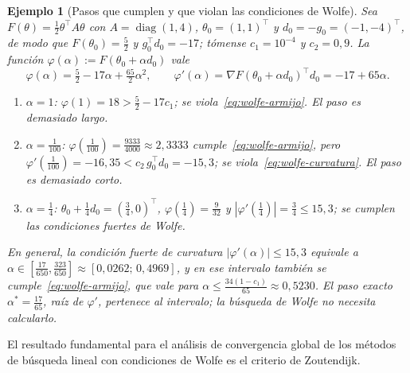 \documentclass[a4paper,openany,oneside,10pt]{report}
\theoremstyle{pnlTeorema}
\theoremstyle{pnlDefinicion}
\theoremstyle{pnlObservacion}
\newtheorem{ejemplo}{Ejemplo}[section]
\begin{document}
\begin{ejemplo}[Pasos que cumplen y que violan las condiciones de Wolfe]\label{ej:wolfe}
Sea $F(\theta)=\frac12\theta^\top A\theta$ con $A=\operatorname{diag}(1,4)$, $\theta_0=(1,1)^\top$ y $d_0=-g_0=(-1,-4)^\top$, de modo que $F(\theta_0)=\frac52$ y $g_0^\top d_0=-17$; tómense $c_1=10^{-4}$ y $c_2=0{,}9$. La función $\varphi(\alpha):=F(\theta_0+\alpha d_0)$ vale
\[
\varphi(\alpha)=\tfrac52-17\alpha+\tfrac{65}{2}\alpha^2,\qquad \varphi'(\alpha)=\nabla F(\theta_0+\alpha d_0)^\top d_0=-17+65\alpha.
\]
\begin{enumerate}
\item $\alpha=1$: $\varphi(1)=18>\frac52-17c_1$; se viola~\eqref{eq:wolfe-armijo}. El paso es demasiado largo.
\item $\alpha=\frac1{100}$: $\varphi(\frac1{100})=\frac{9333}{4000}\approx 2{,}3333$ cumple~\eqref{eq:wolfe-armijo}, pero $\varphi'(\frac1{100})=-16{,}35<c_2\,g_0^\top d_0=-15{,}3$; se viola~\eqref{eq:wolfe-curvatura}. El paso es demasiado corto.
\item $\alpha=\frac14$: $\theta_0+\frac14 d_0=(\frac34,0)^\top$, $\varphi(\frac14)=\frac{9}{32}$ y $|\varphi'(\frac14)|=\frac34\le 15{,}3$; se cumplen las condiciones fuertes de Wolfe.
\end{enumerate}
En general, la condición fuerte de curvatura $|\varphi'(\alpha)|\le 15{,}3$ equivale a $\alpha\in[\frac{17}{650},\frac{323}{650}]\approx[0{,}0262;\,0{,}4969]$, y en ese intervalo también se cumple~\eqref{eq:wolfe-armijo}, que vale para $\alpha\le\frac{34(1-c_1)}{65}\approx 0{,}5230$. El paso exacto $\alpha^*=\frac{17}{65}$, raíz de $\varphi'$, pertenece al intervalo; la búsqueda de Wolfe no necesita calcularlo.
\end{ejemplo}

El resultado fundamental para el análisis de convergencia global de los métodos
de búsqueda lineal con condiciones de Wolfe es el criterio de Zoutendijk.
\end{document}
